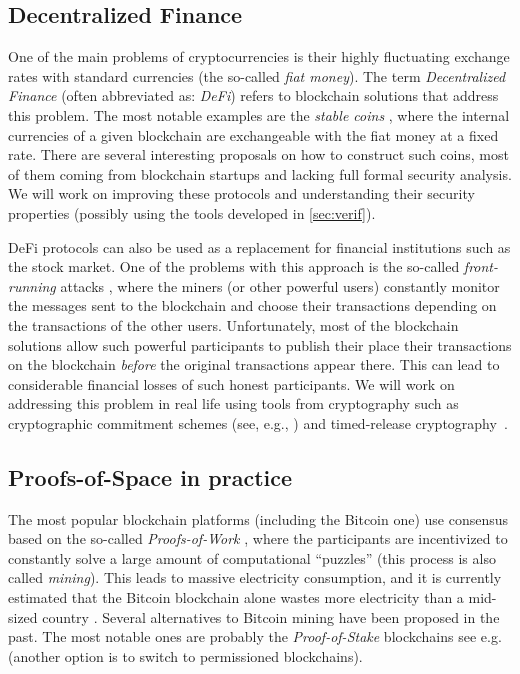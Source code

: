 \documentclass{article}
\begin{document}
\subsection{Decentralized Finance}

One of the main problems of cryptocurrencies is their highly fluctuating exchange rates with standard currencies (the so-called \emph{fiat money}). The term \emph{Decentralized Finance} \cite{enwiki:1030159409} (often abbreviated as: \emph{DeFi}) refers to blockchain solutions that address this problem. The most notable examples are the \emph{stable coins} \cite{Clark2020}, where the internal currencies of a given blockchain are exchangeable with the fiat money at a fixed rate. There are several interesting proposals on how to construct such coins, most of them coming from blockchain startups and lacking full formal security analysis. We will work on improving these protocols and understanding their security properties (possibly using the tools developed in \ref{sec:verif}).
	
DeFi protocols can also be used as a replacement for financial institutions such as the stock market. One of the problems with this approach is the so-called \emph{front-running} attacks \cite{Eskandari2019}, where the miners (or other powerful users) constantly monitor the messages sent to the blockchain and choose their transactions depending on the transactions of the other users. Unfortunately, most of the blockchain solutions allow such powerful participants to publish their place their transactions on the blockchain \emph{before} the original transactions appear there. This can lead to considerable financial losses of such honest participants. We will work on addressing this problem in real life using tools from cryptography such as cryptographic commitment schemes (see, e.g., \cite{Goldreich2001}) and timed-release cryptography~\cite{10.5555/888615}.

\subsection{Proofs-of-Space in practice}\label{sec:PoSpace}

The most popular blockchain platforms (including the Bitcoin one) use consensus based on the so-called \emph{Proofs-of-Work} \cite{Dwork1992}, where the participants are incentivized to constantly solve a large amount of computational ``puzzles'' (this process is also called \emph{mining}). This leads to massive electricity consumption, and it is currently estimated that the Bitcoin blockchain alone wastes more electricity than a mid-sized country \cite{Criddle}. Several alternatives to Bitcoin mining have been proposed in the past. The most notable ones are probably the \emph{Proof-of-Stake} blockchains see e.g.~\cite{Kiayias2017} (another option is to switch to permissioned blockchains).
\end{document}

